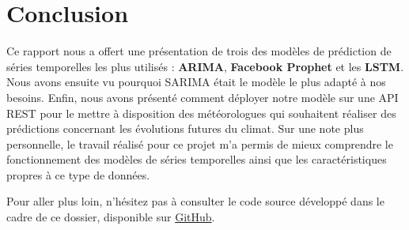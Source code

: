 \documentclass[french]{article}
\begin{document}
    \newpage
    \section*{Conclusion}
    Ce rapport nous a offert une présentation de trois des modèles de prédiction de séries temporelles les plus utilisés : \textbf{ARIMA}, \textbf{Facebook Prophet} et les \textbf{LSTM}. Nous avons ensuite vu pourquoi SARIMA était le modèle le plus adapté à nos besoins. Enfin, nous avons présenté comment déployer notre modèle sur une API REST pour le mettre à disposition des météorologues qui souhaitent réaliser des prédictions concernant les évolutions futures du climat.
    Sur une note plus personnelle, le travail réalisé pour ce projet m'a permis de mieux comprendre le fonctionnement des modèles de séries temporelles ainsi que les caractéristiques propres à ce type de données.

    Pour aller plus loin, n'hésitez pas à consulter le code source développé dans le cadre de ce dossier, disponible sur \href{https://github.com/vinpap/predict_climate_change}{GitHub}.

\end{document}
